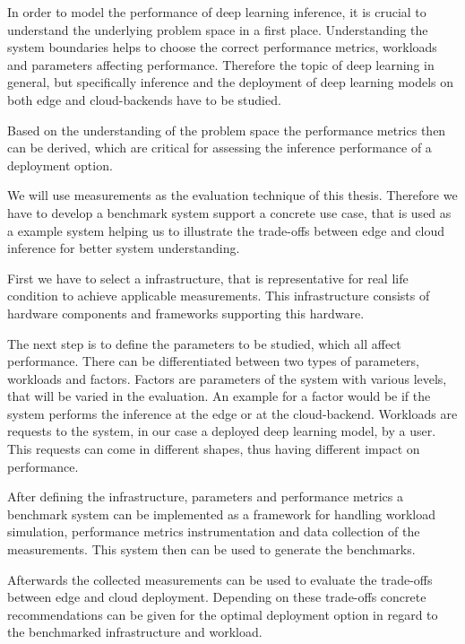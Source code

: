 In order to model the performance of deep learning inference, it is crucial to understand the underlying problem space in a first place.
Understanding the system boundaries helps to choose the correct performance metrics, workloads and parameters affecting performance.
Therefore the topic of deep learning in general, but specifically inference and the deployment of deep learning models on both edge and cloud-backends have to be studied.

Based on the understanding of the problem space the performance metrics then can be derived, which are critical for assessing the inference performance of a deployment option.

We will use measurements as the evaluation technique of this thesis. Therefore we have to develop a benchmark system support a concrete use case, that is used as a example system helping us to illustrate the trade-offs between edge and cloud inference for better system understanding.

First we have to select a infrastructure, that is representative for real life condition to achieve applicable measurements. 
This infrastructure consists of hardware components and frameworks supporting this hardware. 

The next step is to define the parameters to be studied, which all affect performance.
There can be differentiated between two types of parameters, workloads and factors.
Factors are parameters of the system with various levels, that will be varied in the evaluation. An example for a factor would be if the system performs the inference at the edge or at the cloud-backend.
Workloads are requests to the system, in our case a deployed deep learning model, by a user.
This requests can come in different shapes, thus having different impact on performance.



After defining the infrastructure, parameters and performance metrics a benchmark system can be implemented as a framework for handling workload simulation, performance metrics instrumentation and data collection of the measurements.
This system then can be used to generate the benchmarks. 

Afterwards the collected measurements can be used to evaluate the trade-offs between edge and cloud deployment.
Depending on these trade-offs concrete recommendations can be given for the optimal deployment option in regard to the benchmarked infrastructure and workload.




